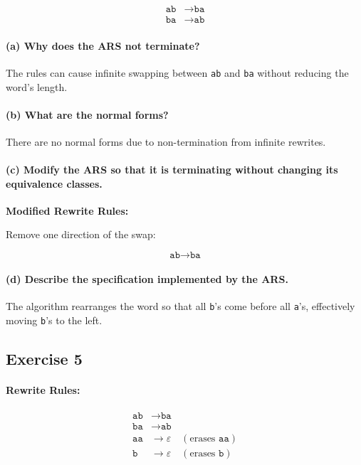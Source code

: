 \documentclass{article}
\theoremstyle{theorem}
\theoremstyle{definition}
\theoremstyle{remark}
\begin{document}
\[
\begin{aligned}
\texttt{ab} &\to \texttt{ba} \\
\texttt{ba} &\to \texttt{ab}
\end{aligned}
\]

\paragraph{(a) Why does the ARS not terminate?}

The rules can cause infinite swapping between \texttt{ab} and \texttt{ba} without reducing the word's length.

\paragraph{(b) What are the normal forms?}

There are no normal forms due to non-termination from infinite rewrites.

\paragraph{(c) Modify the ARS so that it is terminating without changing its equivalence classes.}

\textbf{Modified Rewrite Rules:}

Remove one direction of the swap:

\[
\texttt{ab} \to \texttt{ba}
\]

\paragraph{(d) Describe the specification implemented by the ARS.}

The algorithm rearranges the word so that all \texttt{b}'s come before all \texttt{a}'s, effectively moving \texttt{b}'s to the left.

\subsection*{Exercise 5}

\paragraph{Rewrite Rules:}

\[
\begin{aligned}
\texttt{ab} &\to \texttt{ba} \\
\texttt{ba} &\to \texttt{ab} \\
\texttt{aa} &\to \varepsilon \quad (\text{erases } \texttt{aa}) \\
\texttt{b} &\to \varepsilon \quad (\text{erases } \texttt{b})
\end{aligned}
\]
\end{document}
